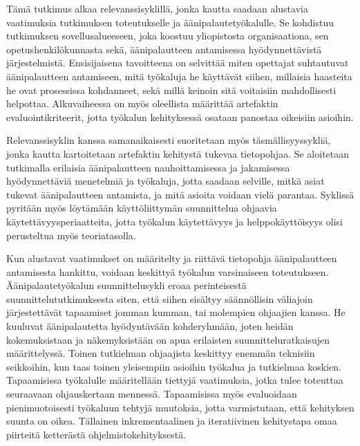 \documentclass[utf8]{gradu3}
\begin{document}
Tämä tutkimus alkaa relevanssisyklillä, jonka kautta saadaan alustavia vaatimuksia tutkimuksen toteutukselle ja äänipalautetyökalulle. Se kohdistuu tutkimuksen sovellusalueeseen, joka koostuu yliopistosta organisaationa, sen opetushenkilökunnasta sekä, äänipalautteen antamisessa hyödynnettävistä järjestelmistä. Ensisijaisena tavoitteena on selvittää miten opettajat suhtautuvat äänipalautteen antamiseen, mitä työkaluja he käyttävät siihen, millaisia haasteita he ovat prosessissa kohdanneet, sekä millä keinoin sitä voitaisiin mahdollisesti helpottaa. Alkuvaiheessa on myös oleellista määrittää artefaktin evaluointikriteerit, jotta työkalun kehityksessä osataan panostaa oikeisiin asioihin.

Relevanssisyklin kanssa samanaikaisesti suoritetaan myös täsmällisyyssykliä, jonka kautta kartoitetaan artefaktin kehitystä tukevaa tietopohjaa. Se aloitetaan tutkimalla erilaisia äänipalautteen nauhoittamisessa ja jakamisessa hyödynnettäviä menetelmiä ja työkaluja, jotta saadaan selville, mitkä asiat tukevat äänipalautteen antamista, ja mitä asioita voidaan vielä parantaa. Syklissä pyritään myös löytämään käyttöliittymän suunnittelua ohjaavia käytettävyysperiaatteita, jotta työkalun käytettävyys ja helppokäyttöisyys olisi perusteltua myös teoriatasolla. 

Kun alustavat vaatimukset on määritelty ja riittävä tietopohja äänipalautteen antamisesta hankittu, voidaan keskittyä työkalun varsinaiseen toteutukseen. Äänipalautetyökalun suunnittelusykli eroaa perinteisestä suunnittelututkimuksesta siten, että siihen sisältyy säännöllisin väliajoin järjestettävät tapaamiset jomman kumman, tai molempien ohjaajien kanssa. He kuuluvat äänipalautetta hyödyntävään kohderyhmään, joten heidän kokemuksistaan ja näkemyksistään on apua erilaisten suunnitteluratkaisujen määrittelyssä. Toinen tutkielman ohjaajista keskittyy enemmän teknisiin seikkoihin, kun taas toinen yleisempiin asioihin työkalua ja tutkielmaa koskien. Tapaamisissa työkalulle määritellään tiettyjä vaatimuksia, jotka tulee toteuttaa seuraavaan ohjauskertaan mennessä. Tapaamisissa myös evaluoidaan pienimuotoisesti työkaluun tehtyjä muutoksia, jotta varmistutaan, että kehityksen suunta on oikea. Tällainen inkrementaalinen ja iteratiivinen kehitystapa omaa piirteitä ketterästä ohjelmistokehityksestä.
\end{document}
